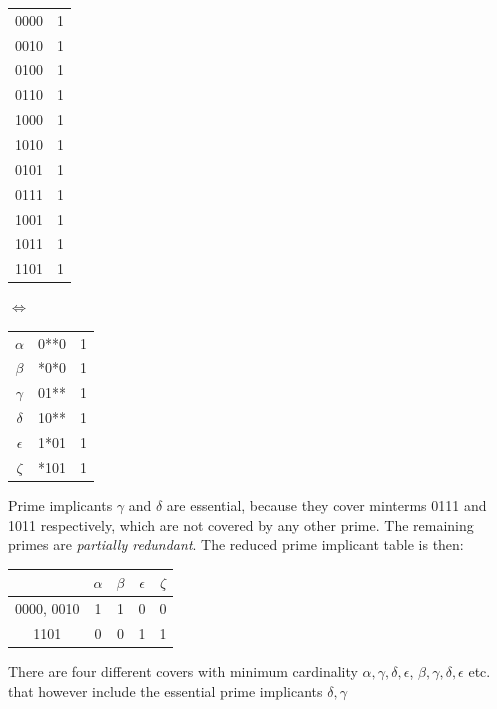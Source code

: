 \begin{center}
		\begin{tabular}{|c c|}
		\hline
		0000 & 1 \\
		0010 & 1 \\
		0100 & 1 \\
		0110 & 1 \\
		1000 & 1 \\
		1010 & 1 \\
		0101 & 1 \\
		0111 & 1 \\
		1001 & 1 \\
		1011 & 1 \\
		1101 & 1 \\
		\hline
	\end{tabular}
	\quad
	\quad
	$ \Leftrightarrow$
	\quad
	\quad
	\begin{tabular}{|c|c c|}
		\hline
		$ \alpha $ & 0**0 & 1 \\
		$ \beta $ & *0*0 & 1 \\
		$ \gamma $ & 01** & 1 \\
		$ \delta $ & 10** & 1 \\
		$ \epsilon $ & 1*01 & 1 \\
		$ \zeta $ & *101 & 1 \\
		\hline
	\end{tabular}
\end{center}

Prime implicants $ \gamma $ and $ \delta $ are essential, because they cover minterms 0111 and 1011 respectively, which are not covered by any other prime. The remaining primes are \textit{partially redundant}. The reduced prime implicant table is then:

\begin{center}
	\begin{tabular}{|c|c c c c|}
	\hline
	{} & $ \alpha $ & $ \beta $  & $ \epsilon $ & $ \zeta $ \\ \hline
	0000, 0010 & 1 & 1 & 0 & 0 \\
	1101 & 0 & 0 & 1 & 1 \\
	\hline
\end{tabular}

\end{center}

There are four different covers with minimum cardinality {$ \alpha, \gamma, \delta, \epsilon $}, {$ \beta,\gamma,\delta,\epsilon $} etc. that however include the essential prime implicants $ \delta, \gamma $ 

